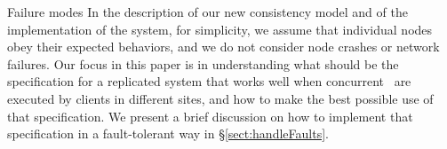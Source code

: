 \changebars{} 
{
{ Failure modes} In the description of our new consistency model and
of the implementation of the system, for simplicity, we assume that
individual nodes obey their expected behaviors, and we do not consider
node crashes or network failures.  Our focus in this paper is in
understanding what should be the specification for a replicated system
that works well when concurrent \operations\ are executed by clients
in different sites, and how to make the best possible use of that
specification.  We present a brief discussion on how to implement that
specification in a fault-tolerant way in \S \ref{sect:handleFaults}.
}







